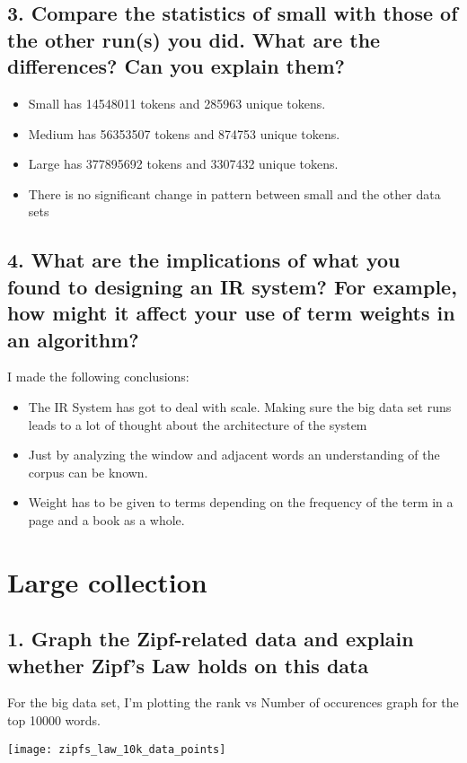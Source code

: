 \documentclass[12pt,letterpaper]{article}
\begin{document}
\subsection*{3. Compare the statistics of small with those of the other run(s) you did. What are the differences?  Can you explain them?}
\begin{itemize}
\item Small has 14548011 tokens and 285963 unique tokens.
\item Medium has 56353507 tokens and 874753 unique tokens.
\item Large has 377895692 tokens and 3307432 unique tokens.
\item There is no significant change in pattern between small and the other data sets
\end{itemize}

\subsection*{4. What are the implications of what you found to designing an IR system?  For example, how might it affect your use of term weights in an algorithm?}
I made the following conclusions:
\begin{itemize}
\item The IR System has got to deal with scale. Making sure the big data set runs leads to a lot of thought about the architecture of the system
\item Just by analyzing the window and adjacent words an understanding of the corpus can be known.
\item Weight has to be given to terms depending on the frequency of the term in a page and a book as a whole.
\end{itemize}


\section*{Large collection}

\subsection*{1. Graph the Zipf-related data and explain whether Zipf's Law holds on this data}
For the big data set, I'm plotting the rank vs Number of occurences graph for the top 10000 words. 
\begin{center}
\texttt{[image: zipfs\_law\_10k\_data\_points]}
\end{center}
\end{document}
